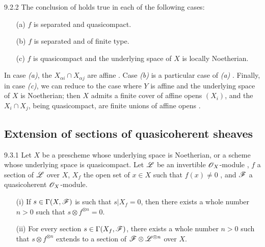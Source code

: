 \documentclass[10pt,oneside]{book}
\begin{document}
\begin{envs}[Corollary]{9.2.2}
\label{cor-1.9.2.2}
The conclusion of  holds true in each of the following cases:
\begin{itemize}
  \item[(a)] $f$ is separated and quasicompact.
  \item[(b)] $f$ is separated and of finite type.
  \item[(c)] $f$ is quasicompact and the underlying space of $X$ is locally Noetherian.
\end{itemize}
\end{envs}

In case \emph{(a)}, the $X_{\alpha i}\cap X_{\alpha j}$ are affine .
Case \emph{(b)} is a particular case of \emph{(a)} . Finally, in case
\emph{(c)}, we can reduce to the case where $Y$ is affine and the underlying
space of $X$ is Noetherian; then $X$ admits a finite cover of affine opens
$(X_i)$, and the $X_i\cap X_j$, being quasicompact, are finite unions of affine
opens .

\subsection{Extension of sections of quasicoherent sheaves}
\label{1-schemes-9.3}

\begin{envs}[Theorem]{9.3.1}
\label{thm-1.9.3.1}
Let $X$ be a prescheme whose underlying space is Noetherian, or a scheme whose underlying
space is quasicompact. Let $\mathscr{L}$ be an invertible $\mathscr{O}_X$-module , $f$ a
section of $\mathscr{L}$ over $X$, $X_f$ the open set of $x\in X$ such that $f(x)\neq0$
, and $\mathscr{F}$ a quasicoherent $\mathscr{O}_X$-module.
\begin{itemize}
  \item[(i)] If $s\in\Gamma(X,\mathscr{F})$ is such that $s|X_f=0$,
             then there exists a whole number $n>0$ such that $s\otimes f^{\otimes n}=0$.
  \item[(ii)] For every section $s\in\Gamma(X_f,\mathscr{F})$, there exists a whole number
              $n>0$ such that $s\otimes f^{\otimes n}$ extends to a section of
              $\mathscr{F}\otimes\mathscr{L}^{\otimes n}$ over $X$.
\end{itemize}
\end{envs}
\end{document}
